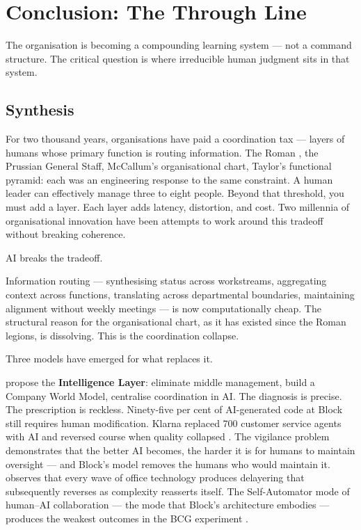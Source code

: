 \chapter{Conclusion: The Through Line}
\label{ch:conclusion}

\epigraph{The organisation is becoming a compounding learning system --- not a command structure. The critical question is where irreducible human judgment sits in that system.}{}

\section{Synthesis}

For two thousand years, organisations have paid a coordination tax --- layers of humans whose primary function is routing information. The Roman , the Prussian General Staff, McCallum's organisational chart, Taylor's functional pyramid: each was an engineering response to the same constraint. A human leader can effectively manage three to eight people. Beyond that threshold, you must add a layer. Each layer adds latency, distortion, and cost. Two millennia of organisational innovation have been attempts to work around this tradeoff without breaking coherence.

AI breaks the tradeoff.

Information routing --- synthesising status across workstreams, aggregating context across functions, translating across departmental boundaries, maintaining alignment without weekly meetings --- is now computationally cheap. The structural reason for the organisational chart, as it has existed since the Roman legions, is dissolving. This is the coordination collapse.

Three models have emerged for what replaces it.

\textcite{DorseyBotha2026} propose the \textbf{Intelligence Layer}: eliminate middle management, build a Company World Model, centralise coordination in AI. The diagnosis is precise. The prescription is reckless. Ninety-five per cent of AI-generated code at Block still requires human modification. Klarna replaced 700 customer service agents with AI and reversed course when quality collapsed \parencite{Klarna2025}. The vigilance problem \parencite{DellAcqua2023} demonstrates that the better AI becomes, the harder it is for humans to maintain oversight --- and Block's model removes the humans who would maintain it. \textcite{Spicer2026} observes that every wave of office technology produces delayering that subsequently reverses as complexity reasserts itself. The Self-Automator mode of human--AI collaboration --- the mode that Block's architecture embodies --- produces the weakest outcomes in the BCG experiment \parencite{Randazzo2024}.

